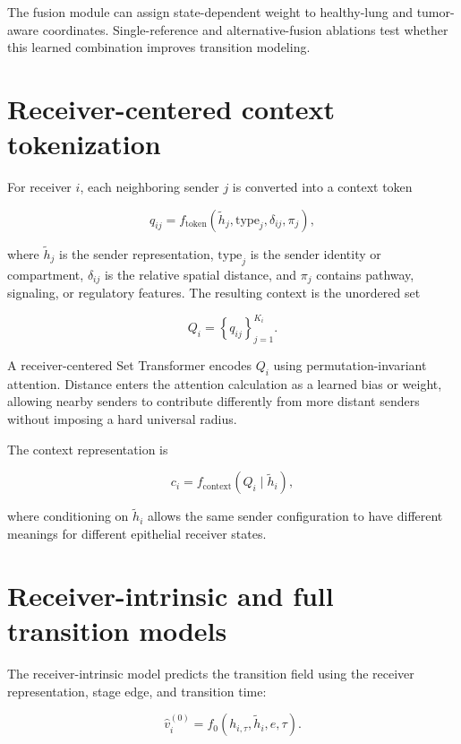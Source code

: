 The fusion module can assign state-dependent weight to healthy-lung and tumor-aware coordinates. Single-reference and alternative-fusion ablations test whether this learned combination improves transition modeling.

\section{Receiver-centered context tokenization}

For receiver $i$, each neighboring sender $j$ is converted into a context token

\begin{equation}
q_{ij}
=
f_{\mathrm{token}}
\left(
\tilde{h}_j,
\mathrm{type}_j,
\delta_{ij},
\pi_j
\right),
\end{equation}

where $\tilde{h}_j$ is the sender representation, $\mathrm{type}_j$ is the sender identity or compartment, $\delta_{ij}$ is the relative spatial distance, and $\pi_j$ contains pathway, signaling, or regulatory features. The resulting context is the unordered set

\begin{equation}
Q_i=\left\{q_{ij}\right\}_{j=1}^{K_i}.
\end{equation}

A receiver-centered Set Transformer encodes $Q_i$ using permutation-invariant attention. Distance enters the attention calculation as a learned bias or weight, allowing nearby senders to contribute differently from more distant senders without imposing a hard universal radius.

The context representation is

\begin{equation}
c_i
=
f_{\mathrm{context}}\left(Q_i\mid \tilde{h}_i\right),
\end{equation}

where conditioning on $\tilde{h}_i$ allows the same sender configuration to have different meanings for different epithelial receiver states.

\section{Receiver-intrinsic and full transition models}

The receiver-intrinsic model predicts the transition field using the receiver representation, stage edge, and transition time:

\begin{equation}
\hat{v}_{i}^{(0)}
=
f_{0}\left(h_{i,\tau},\tilde{h}_i,e,\tau\right).
\end{equation}

